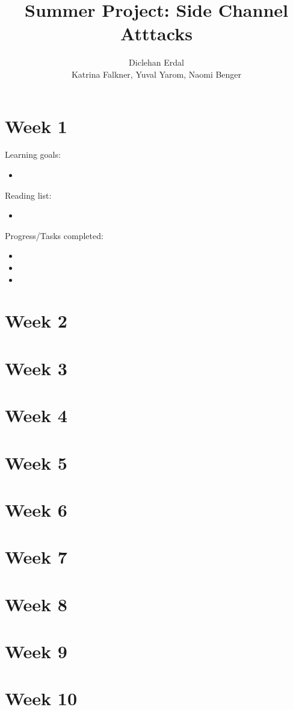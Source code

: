\documentclass[a4paper, 10pt, envcountsect, runningheads]{article}
\begin{document}
\title{Summer Project: Side Channel Atttacks}
\author{Diclehan Erdal\\ Katrina Falkner, Yuval Yarom, Naomi Benger}

\maketitle

\section*{Week 1}
Learning goals:
\begin{itemize}
\item 
\end{itemize}

Reading list:
\begin{itemize}
\item 
\end{itemize}


Progress/Tasks completed:
\begin{itemize}
\item 
\item 
\item 
\end{itemize}


\section*{Week 2}

\section*{Week 3}

\section*{Week 4}

\section*{Week 5}

\section*{Week 6}

\section*{Week 7}

\section*{Week 8}

\section*{Week 9}

\section*{Week 10}
\end{document}
